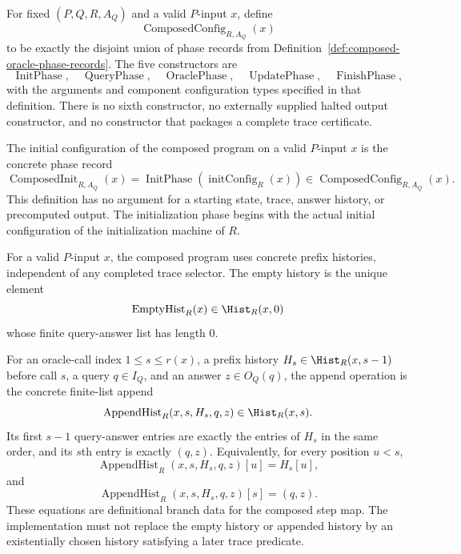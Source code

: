 \begin{definition}
  \label{def:composed-oracle-program-carrier}
  For fixed $(P,Q,R,A_Q)$ and a valid $P$-input $x$, define
  \[
    \operatorname{ComposedConfig}_{R,A_Q}(x)
  \]
  to be exactly the disjoint union of phase records from
  Definition~\ref{def:composed-oracle-phase-records}.  The five constructors
  are
  \[
    \operatorname{InitPhase},\quad \operatorname{QueryPhase},\quad
    \operatorname{OraclePhase},\quad \operatorname{UpdatePhase},\quad
    \operatorname{FinishPhase},
  \]
  with the arguments and component configuration types specified in that
  definition.  There is no sixth constructor, no externally supplied halted
  output constructor, and no constructor that packages a complete trace
  certificate.
\end{definition}

\begin{definition}
  \label{def:composed-oracle-initial-configuration}
  The initial configuration of the composed program on a valid $P$-input $x$ is
  the concrete phase record
  \[
    \operatorname{ComposedInit}_{R,A_Q}(x)
      =
    \operatorname{InitPhase}(\operatorname{initConfig}_R(x))
    \in \operatorname{ComposedConfig}_{R,A_Q}(x).
  \]
  This definition has no argument for a starting state, trace, answer history,
  or precomputed output.  The initialization phase begins with the actual
  initial configuration of the initialization machine of $R$.
\end{definition}

\begin{definition}
  \label{def:composed-oracle-history-operations}
  For a valid $P$-input $x$, the composed program uses concrete prefix
  histories, independent of any completed trace selector.  The empty history
  is the unique element
  \[
    \operatorname{EmptyHist}_R(x)\in\Hist_R(x,0)
  \]
  whose finite query-answer list has length $0$.

  For an oracle-call index $1\leq s\leq r(x)$, a prefix history
  $H_s\in\Hist_R(x,s-1)$ before call $s$, a query $q\in I_Q$, and an answer
  $z\in O_Q(q)$, the append operation is the concrete finite-list append
  \[
    \operatorname{AppendHist}_R(x,s,H_s,q,z)\in\Hist_R(x,s).
  \]
  Its first $s-1$ query-answer entries are exactly the entries of $H_s$ in the
  same order, and its $s$th entry is exactly $(q,z)$.  Equivalently, for every
  position $u<s$,
  \[
    \operatorname{AppendHist}_R(x,s,H_s,q,z)[u]=H_s[u],
  \]
  and
  \[
    \operatorname{AppendHist}_R(x,s,H_s,q,z)[s]=(q,z).
  \]
  These equations are definitional branch data for the composed step map.  The
  implementation must not replace the empty history or appended history by an
  existentially chosen history satisfying a later trace predicate.
\end{definition}

